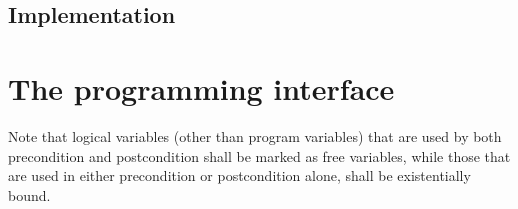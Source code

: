 \subsection{Implementation}



\section{The programming interface}

Note that logical variables (other than program variables) that are used by both precondition and postcondition shall be marked as free variables, while those that are used in either precondition or postcondition alone, shall be existentially bound. 

